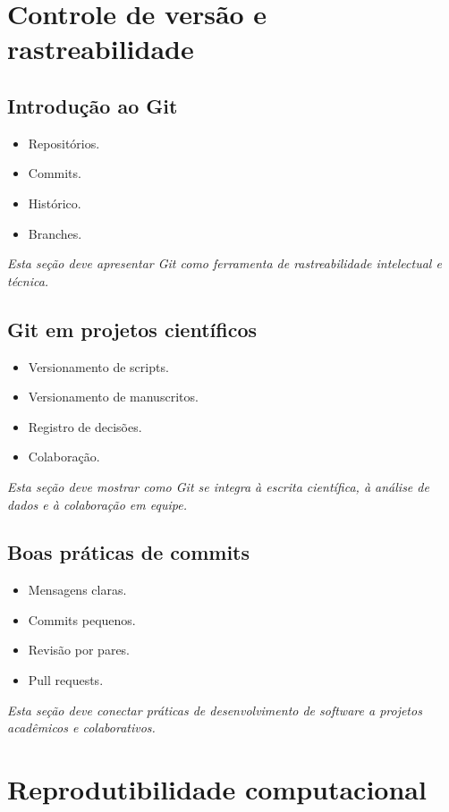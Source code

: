 \documentclass[12pt,openany]{book}
\newcommand{\placeholder}[1]{
    \par\medskip
    \noindent\textit{#1}
    \par\medskip
}
\newcommand{\topicos}[1]{
    \begin{itemize}
        #1
    \end{itemize}
}
\begin{document}
\begin{refsection}
\chapter{Controle de versão e rastreabilidade}

\section{Introdução ao Git}

\topicos{
    \item Repositórios.
    \item Commits.
    \item Histórico.
    \item Branches.
}

\placeholder{Esta seção deve apresentar Git como ferramenta de rastreabilidade intelectual e técnica.}

\section{Git em projetos científicos}

\topicos{
    \item Versionamento de scripts.
    \item Versionamento de manuscritos.
    \item Registro de decisões.
    \item Colaboração.
}

\placeholder{Esta seção deve mostrar como Git se integra à escrita científica, à análise de dados e à colaboração em equipe.}

\section{Boas práticas de commits}

\topicos{
    \item Mensagens claras.
    \item Commits pequenos.
    \item Revisão por pares.
    \item Pull requests.
}

\placeholder{Esta seção deve conectar práticas de desenvolvimento de software a projetos acadêmicos e colaborativos.}

\chapter{Reprodutibilidade computacional}


\end{refsection}
\end{document}
